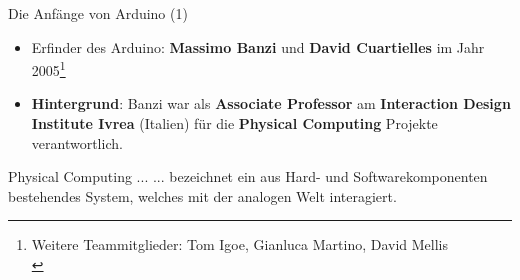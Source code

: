 \documentclass{beamer}
\begin{document}
\begin{frame}{Die Anf\"ange von Arduino (1)}
\begin{itemize}
	 \item Erfinder des Arduino: \textbf{Massimo Banzi} und \textbf{David Cuartielles} im Jahr 2005\footnote{Weitere Teammitglieder: Tom Igoe, Gianluca Martino, David Mellis\cite{IEEE:2016:TheMakingOfArduino}\\}
\end{itemize}
\begin{itemize}
	\item \textbf{Hintergrund}: Banzi war als \textbf{Associate Professor} am \textbf{Interaction Design Institute Ivrea} (Italien) f\"ur die \textbf{Physical Computing} Projekte verantwortlich.
\end{itemize}
\begin{alertblock}{Physical Computing ...}
	... bezeichnet ein aus Hard- und Softwarekomponenten bestehendes System, welches mit der analogen Welt interagiert.
\end{alertblock}
\end{frame}
\end{document}
